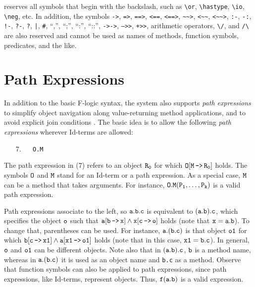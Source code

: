 \documentclass[11pt]{article}
\newcommand{\ERGO}{\mbox{\smaller{\ensuremath{\cal{E}}\smaller{{\sc{RGO}}}}}\xspace}
\newcommand{\FLSYSTEM}{\ERGO}
\newcommand{\mvd}{{\mbox{\tt \,->\,}}}  %
\newcommand{\rnafarr}{\texttt{\textasciitilde\textasciitilde>}}
\newcommand{\lnafarr}{\texttt{<\textasciitilde\textasciitilde}}
\newcommand{\rlnafarr}{\texttt{<\textasciitilde\textasciitilde>}}
\newcommand{\bs}{\textbackslash}
\newcommand{\fl}{\mbox{F-logic}\xspace}
\newcommand{\RULELOGNEG}{{\texttt{{\bs}neg}}\xspace}
\begin{document}
\FLSYSTEM reserves all symbols that begin with the backslash, such as
\texttt{\bs{}or},  \texttt{\bs{}hastype},  \texttt{\bs{}io}, \RULELOGNEG, etc. 
In addition, the symbols \texttt{->}, \texttt{=>}, \texttt{==>}, \texttt{<==},
\texttt{<==>}, \rnafarr, \lnafarr, \rlnafarr, \texttt{:-}, \texttt{-:},
\texttt{!-}, \texttt{?-}, \texttt{?}, \texttt{|}, \texttt{\#}, ``,'', ``;'',
``:'', ``::'', \texttt{->->}, \texttt{-->>},  \texttt{+>>},  
arithmetic operators, \verb|\/|, and \verb|/\|  
are also reserved and cannot be used as names of methods,
function symbols, predicates, and the like.



\section{Path Expressions}\label{sec-pathexpr}


 
In addition to the basic \fl syntax, the \FLSYSTEM  system also supports
\emph{path expressions} to simplify object navigation along
value-returning method applications, and to avoid
explicit join conditions \cite{frohn-lausen-uphoff-VLDB-94}.  The
basic idea is to allow the following \emph{path expressions} wherever
Id-terms are allowed:

  \medskip

\begin{enumerate} 
\item[7.]\label{eq-path-fun} ~~ {\tt O.M}
\end{enumerate} \medskip

\noindent
The path expression in (7) refers to an object $\tt R_0$ for which $\tt
O[M\mvd R_0]$ holds.  The symbols $\tt O$ and $\tt M$ stand for an Id-term
or a path expression.  As a special case, $\tt M$ can be a method that
takes arguments. For instance, $\tt O.M(P_1,\dots,P_k)$ is a valid path
expression.
  
Path expressions
associate to the left, so $\tt a.b.c$ is equivalent to $\tt (a.b).c$, which
specifies the object $\tt o$ such that $\tt a[b\mvd x] \land x[c\mvd o]$
holds (note that $\tt x=a.b$).
To change that, parentheses can be used. For instance, 
$\tt a.(b.c)$ is that object
$\tt o1$ for which $\tt b[c\mvd x1] \land a[x1\mvd o1]$ holds (note that in this
case, $\tt x1=b.c$). In general, $\tt o$ and $\tt o1$ can be different objects.
Note also that in $\tt (a.b).c$, $\tt b$ is a method name, whereas in $\tt
a.(b.c)$ it is used as an object name and {\tt b.c} as a method.  Observe
that function symbols can also be applied to path expressions, since path
expressions, like Id-terms, represent objects. Thus, $\tt f(a.b)$
is a valid expression.
\end{document}
